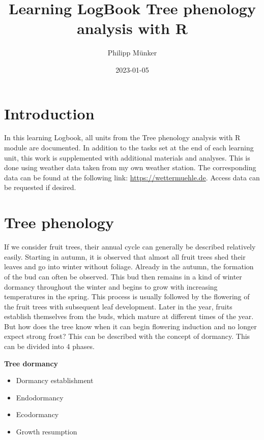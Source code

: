 \documentclass[
]{book}
\title{Learning LogBook Tree phenology analysis with R}
\author{Philipp Münker}
\date{2023-01-05}
\providecommand{\tightlist}{%
  \setlength{\itemsep}{0pt}\setlength{\parskip}{0pt}}
\begin{document}
\maketitle

{
\setcounter{tocdepth}{1}
\tableofcontents
}
\hypertarget{introduction}{%
\chapter{Introduction}\label{introduction}}

In this learning Logbook, all units from the Tree phenology analysis with R module are documented. In addition to the tasks set at the end of each learning unit, this work is supplemented with additional materials and analyses. This is done using weather data taken from my own weather station. The corresponding data can be found at the following link: \url{https://wettermuehle.de}. Access data can be requested if desired.

\hypertarget{tree-phenology}{%
\chapter{Tree phenology}\label{tree-phenology}}

If we consider fruit trees, their annual cycle can generally be described relatively easily. Starting in autumn, it is observed that almost all fruit trees shed their leaves and go into winter without foliage. Already in the autumn, the formation of the bud can often be observed. This bud then remains in a kind of winter dormancy throughout the winter and begins to grow with increasing temperatures in the spring. This process is usually followed by the flowering of the fruit trees with subsequent leaf development. Later in the year, fruits establish themselves from the buds, which mature at different times of the year.
But how does the tree know when it can begin flowering induction and no longer expect strong frost?
This can be described with the concept of dormancy. This can be divided into 4 phases.

\textbf{Tree dormancy}

\begin{itemize}
\tightlist
\item
  Dormancy establishment
\item
  Endodormancy
\item
  Ecodormancy
\item
  Growth resumption
\end{itemize}
\end{document}
